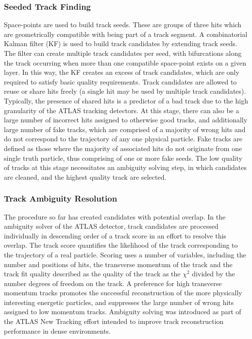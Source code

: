 \subsubsection{Seeded Track Finding}
Space-points are used to build track seeds. These are groups of three hits which are geometrically compatible with being part of a track segment. A combinatorial Kalman filter (KF) is used to build track candidates by extending track seeds. The filter can create multiple track candidates per seed, with bifurcations along the track occurring when more than one compatible space-point exists on a given layer. In this way, the KF creates an excess of track candidates, which are only required to satisfy basic quality requirements. Track candidates are allowed to reuse or share hits freely (a single hit may be used by multiple track candidates). Typically, the presence of shared hits is a predictor of a bad track due to the high granularity of the ATLAS tracking detectors. At this stage, there can also be a large number of incorrect hits assigned to otherwise good tracks, and additionally large number of fake tracks, which are comprised of a majority of wrong hits and do not correspond to the trajectory of any one physical particle.  Fake tracks are defined as those where the majority of associated hits do not originate from one single truth particle, thus comprising of one or more fake seeds. The low quality of tracks at this stage necessitates an ambiguity solving step, in which candidates are cleaned, and the highest quality track are selected.

\subsubsection{Track Ambiguity Resolution}

The procedure so far has created candidates with potential overlap. In the ambiguity solver of the ATLAS detector, track candidates are processed individually in descending order of a track score in an effort to resolve this overlap. The track score quantifies the likelihood of the track corresponding to the trajectory of a real particle. Scoring uses a number of variables, including the number and positions of hits, the transverse momentum of the track and the track fit quality described as the quality of the track as the $\chi^{2}$ divided by the number degrees of freedom on the track. A preference for high transverse momentum tracks promotes the successful reconstruction of the more physically interesting energetic particles, and suppresses the large number of wrong hits assigned to low momentum tracks. Ambiguity solving was introduced as part of the ATLAS New Tracking effort \cite{Cornelissen:2007vba} intended to improve track reconstruction performance in dense environments. 

